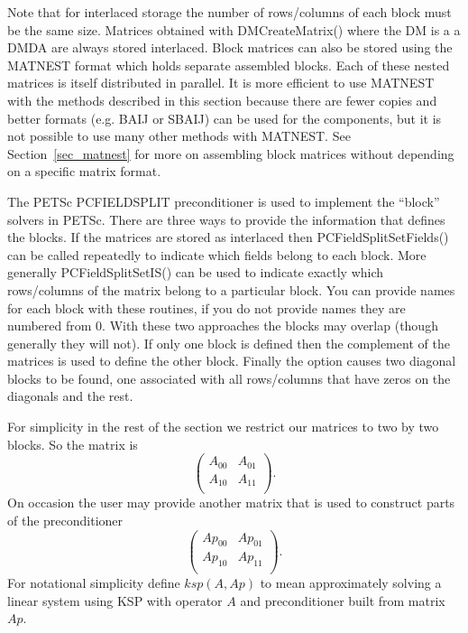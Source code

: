 Note that for interlaced storage the number of rows/columns of each
block must be the same size. Matrices obtained with DMCreateMatrix()
where the DM is a a DMDA are always stored interlaced.
Block matrices can also be stored using the MATNEST format which holds separate assembled blocks.
Each of these nested matrices is itself distributed in parallel.
It is more efficient to use MATNEST with the methods described in this section because there are fewer copies and better formats (e.g. BAIJ or SBAIJ) can be used for the components, but it is not possible to use many other methods with MATNEST.
See Section~\ref{sec_matnest} for more on assembling block matrices without depending on a specific matrix format.

The PETSc PCFIELDSPLIT preconditioner is used to implement the
``block'' solvers in PETSc. There are three ways to provide the
information that defines the blocks.  If the matrices are stored as
interlaced then PCFieldSplitSetFields() can be called repeatedly to
indicate which fields belong to each block. More generally
PCFieldSplitSetIS() can be used to indicate exactly which rows/columns
of the matrix belong to a particular block. You can provide names for each block with these routines, if you do not provide
names they are numbered from 0. With these two approaches
the blocks may overlap (though generally they will not). If only one
block is defined then the complement of the matrices is used to define
the other block. Finally the
option 
 causes two diagonal blocks to be found, one associated with all
rows/columns that have zeros on the diagonals and the rest.

For simplicity in the rest of the section we restrict our matrices to two by two blocks. So the matrix is
\[
\left( \begin{array}{cc}
A_{00}   & A_{01} \\
A_{10}   & A_{11} \\
\end{array} \right).
\]
On occasion the user may provide another matrix that is used to construct parts of the preconditioner
\[
\left( \begin{array}{cc}
Ap_{00}   & Ap_{01} \\
Ap_{10}   & Ap_{11} \\
\end{array} \right).
\]
For notational simplicity define $ ksp(A,Ap) $ to mean approximately solving a linear system using KSP with operator $ A$ and
preconditioner built from matrix $Ap$.

